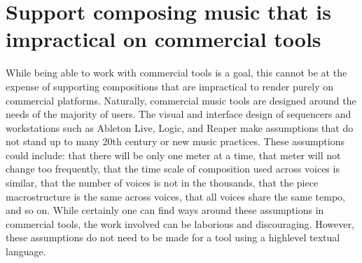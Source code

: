 \documentclass[letterpaper,10pt,english]{sphinxmanual}
\begin{document}
\section{Support composing music that is impractical on commercial tools}
\label{\detokenize{goals:support-composing-music-that-is-impractical-on-commercial-tools}}
\sphinxAtStartPar
While being able to work with commercial tools is a goal, this cannot be at the expense of supporting
compositions that are impractical to render purely on commercial platforms.
Naturally, commercial music tools are designed around the needs of the majority of users.
The visual and interface design of sequencers and workstations such as Ableton Live, Logic, and Reaper
make assumptions that do not stand up to many 20th century or new music practices.
These assumptions could include: that there will be only one meter at a time, that meter will not change too frequently,
that the time scale of composition used across voices is similar, that the number of voices is not
in the thousands, that the piece macro\sphinxhyphen{}structure is the same across voices, that all voices share the same tempo,
and so on. While certainly one can find ways around these assumptions in commercial tools, the work
involved can be laborious and discouraging.
However, these assumptions do not need to be made for a tool using a high\sphinxhyphen{}level textual language.
\end{document}
